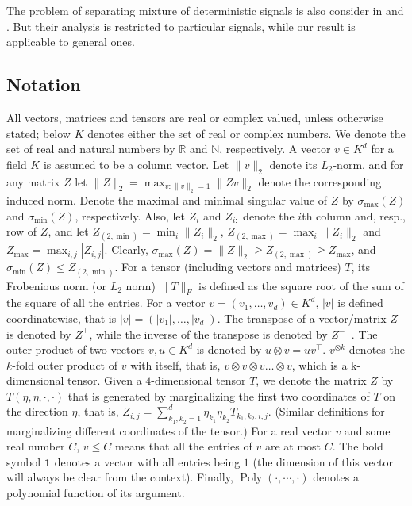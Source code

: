 \documentclass[11pt]{article}
\newcommand{\real}{\mathbb{R}}
\renewcommand{\natural}{\mathbb{N}}
\DeclareMathOperator{\pol}{Poly}
\newcommand{\poly}[1]{\pol\left(#1\right)}
\begin{document}
The problem of separating mixture of deterministic signals is also consider in \citep{kirimoto2011separation} and \citep{forootan2013separation}. But their analysis is restricted to particular signals, while our result is applicable to general ones.

\subsection{Notation}
\label{subsec:ICANotation}
All vectors, matrices and tensors are real or complex valued, unless otherwise stated; below $K$ denotes either the set of real or complex numbers. We denote the set of real and natural numbers by $\real$ and $\natural$, respectively.
A vector $v \in K^d$ for a field $K$ is assumed to be a column vector.
Let $\|v\|_2$ denote its $L_2$-norm, and for any matrix $Z$ let $\|Z\|_2=\max_{v:\|v\|_2=1}{\|Z v\|_2}$ denote the corresponding induced norm. Denote the maximal and minimal singular value of $Z$ by $\sigma_{\max}(Z)$ and  $\sigma_{\min}(Z)$, respectively. Also, let $Z_i$ and $Z_{i:}$ denote the $i$th column and, resp., row of $Z$, and let $Z_{(2,\min)} = \min_{i} \|Z_i\|_2$, $Z_{(2,\max)} = \max_{i} \|Z_i\|_2$ and $Z_{\max} = \max_{i,j} |Z_{i,j}|$. 
Clearly, $\sigma_{\max}(Z) =\|Z\|_2 \ge Z_{(2,\max)} \ge Z_{\max}$, and $\sigma_{\min}(Z) \le Z_{(2,\min)}$. For a tensor (including vectors and matrices) $T$, its Frobenious norm (or $L_2$ norm) $\|T\|_F$  is defined as the square root of the sum of the square of all the entries.  
For a vector $v=(v_1,\ldots,v_d) \in K^d$, $\vert v \vert$ is defined coordinatewise, that is $\vert v \vert=(\vert v_1 \vert,\ldots,\vert v_d\vert)$. 
The transpose of a vector/matrix $Z$ is denoted by $Z^\top$, while the inverse of the transpose is denoted by $Z^{-\top}$.  
The outer product of two vectors $v, u \in K^d$ is denoted by $u\otimes v=u v^\top$. 
$v^{\otimes k}$ denotes the $k$-fold outer product of $v$ with itself, that is, $v\otimes v\otimes v \ldots \otimes v$, which is a k-dimensional tensor.
Given a $4$-dimensional tensor $T$, we denote the matrix $Z$ by $T(\eta,\eta,\cdot , \cdot)$ that is generated by marginalizing the first two coordinates of $T$ on the direction $\eta$, that is,
$Z_{i,j} = \sum_{k_1,k_2 = 1}^{d} \eta_{k_1} \eta_{k_2} T_{k_1,k_2,i,j}$. (Similar definitions for marginalizing different coordinates of the tensor.)
For a real vector $v$ and some real number $C$, $v \le C$ means that all the entries of $v$ are at most $C$. 
The bold symbol $\boldsymbol{1}$ denotes a vector with all entries being $1$ (the dimension of this vector will always be clear from the context).
Finally, $\poly{\cdot,\cdots,\cdot}$ denotes a polynomial function of its argument.
\end{document}
